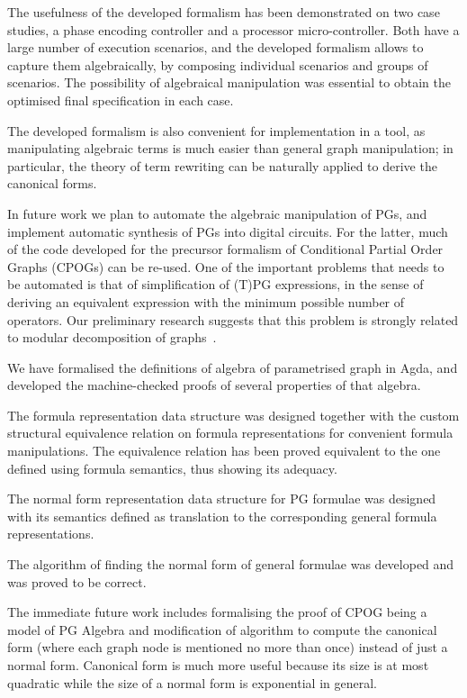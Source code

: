 The usefulness of the developed formalism has been demonstrated on
two case studies, a phase encoding controller and a processor micro-controller.
Both have a large number of execution scenarios, and the developed
formalism allows to capture them algebraically, by composing individual
scenarios and groups of scenarios. The possibility of algebraical
manipulation was essential to obtain the optimised final specification
in each case.

The developed formalism is also convenient for implementation in a
tool, as manipulating algebraic terms is much easier than general
graph manipulation; in particular, the theory of term rewriting can
be naturally applied to derive the canonical forms.

In future work we plan to automate the algebraic manipulation of PGs,
and implement automatic synthesis of PGs into digital circuits. For
the latter, much of the code developed for the precursor formalism
of Conditional Partial Order Graphs (CPOGs) can be re-used. One of
the important problems that needs to be automated is that of simplification
of (T)PG expressions, in the sense of deriving an equivalent expression
with the minimum possible number of operators. Our preliminary research
suggests that this problem is strongly related to modular decomposition
of graphs~\cite{2005_McConnell_modular}.

We have formalised the definitions of algebra of parametrised graph in Agda, and developed the machine-checked proofs of several properties of that algebra.

The formula representation data structure was designed together with the custom structural equivalence relation on formula representations for convenient formula manipulations. The equivalence relation has been proved equivalent to the one defined using formula semantics, thus showing its adequacy.

The normal form representation data structure for PG formulae was designed with its semantics defined as translation to the corresponding general formula representations.

The algorithm of finding the normal form of general formulae was developed and was proved to be correct.

The immediate future work includes formalising the proof of CPOG being a model of PG Algebra and modification of algorithm to compute the canonical form (where each graph node is mentioned no more than once) instead of just a normal form. Canonical form is much more useful because its size is at most quadratic while the size of a normal form is exponential in general.

